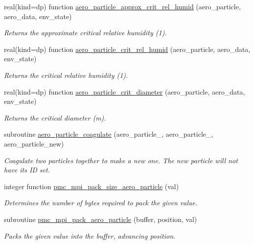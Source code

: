 \begin{DoxyCompactItemize}
real(kind=dp) function \mbox{\hyperlink{namespacepmc__aero__particle_a4a0f2be70516b5f8c48452c9685bd1f5}{aero\+\_\+particle\+\_\+approx\+\_\+crit\+\_\+rel\+\_\+humid}} (aero\+\_\+particle, aero\+\_\+data, env\+\_\+state)
\begin{DoxyCompactList}\small\item\em Returns the approximate critical relative humidity (1). \end{DoxyCompactList}\item 
real(kind=dp) function \mbox{\hyperlink{namespacepmc__aero__particle_a48bd3a40c0b3586c301b73bbd625a845}{aero\+\_\+particle\+\_\+crit\+\_\+rel\+\_\+humid}} (aero\+\_\+particle, aero\+\_\+data, env\+\_\+state)
\begin{DoxyCompactList}\small\item\em Returns the critical relative humidity (1). \end{DoxyCompactList}\item 
real(kind=dp) function \mbox{\hyperlink{namespacepmc__aero__particle_a34bb7e8e2a2ff359f0e638c74486c73d}{aero\+\_\+particle\+\_\+crit\+\_\+diameter}} (aero\+\_\+particle, aero\+\_\+data, env\+\_\+state)
\begin{DoxyCompactList}\small\item\em Returns the critical diameter (m). \end{DoxyCompactList}\item 
subroutine \mbox{\hyperlink{namespacepmc__aero__particle_a16b56468e94b1b0429de015112a4bf6f}{aero\+\_\+particle\+\_\+coagulate}} (aero\+\_\+particle\+\_, aero\+\_\+particle\+\_, aero\+\_\+particle\+\_\+new)
\begin{DoxyCompactList}\small\item\em Coagulate two particles together to make a new one. The new particle will not have its ID set. \end{DoxyCompactList}\item 
integer function \mbox{\hyperlink{namespacepmc__aero__particle_a1f0365c14bb9b38724842c598cb152ed}{pmc\+\_\+mpi\+\_\+pack\+\_\+size\+\_\+aero\+\_\+particle}} (val)
\begin{DoxyCompactList}\small\item\em Determines the number of bytes required to pack the given value. \end{DoxyCompactList}\item 
subroutine \mbox{\hyperlink{namespacepmc__aero__particle_acc276aa4c58444d1b3575a80cf758bb4}{pmc\+\_\+mpi\+\_\+pack\+\_\+aero\+\_\+particle}} (buffer, position, val)
\begin{DoxyCompactList}\small\item\em Packs the given value into the buffer, advancing position. \end{DoxyCompactList}\item 

\end{DoxyCompactItemize}
